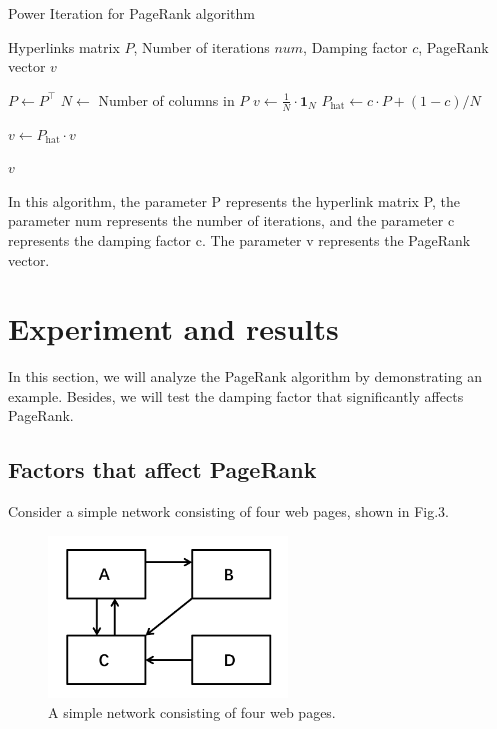 \documentclass[lettersize,journal,12pt,conference]{IEEEtran}
\begin{document}
\begin{algorithm}
	\caption{Power Iteration for PageRank algorithm}
	\label{alg:pagerank}
	\begin{algorithmic}[1]
	
	\REQUIRE Hyperlinks matrix $P$, Number of iterations $num$, Damping factor $c$, PageRank vector $v$
	
	\STATE $P \gets P^\top$ 
	\STATE $N \gets$ Number of columns in $P$
	\STATE $v \gets \frac{1}{N} \cdot \mathbf{1}_N$ 
	\STATE $P_{\text{hat}} \gets c \cdot P + (1 - c) / N$ 

		\STATE $v \gets P_{\text{hat}} \cdot v$ 
	\ENDFOR
	
	\RETURN $v$
	
	\end{algorithmic}
\end{algorithm}

In this algorithm, the parameter P represents the hyperlink matrix P, the parameter num represents the number of iterations, and the parameter c represents the damping factor c. The parameter v represents the PageRank vector.

\section{Experiment and results}

In this section, we will analyze the PageRank algorithm by demonstrating an example. Besides, we will test the damping factor that significantly affects PageRank.

\subsection{Factors that affect PageRank}

Consider a simple network consisting of four web pages, shown in Fig.3.

\begin{figure}[h]
	\centering
	\includegraphics[width=2.5in]{images/fig5.png}
	\caption{A simple network consisting of four web pages.}
	\label{fig4}
\end{figure}
\end{document}
